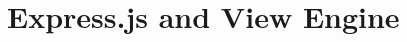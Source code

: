 \chapter{Express.js and View Engine}\label{ch:express-js-and-view-engine}

\setimgdir
\minitoc





